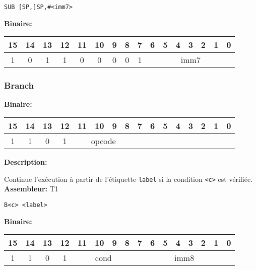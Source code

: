 \documentclass{article}
\begin{document}
    \begin{lstlisting}
SUB [SP,]SP,#<imm7>
    \end{lstlisting}



    \textbf{Binaire:}

    \begin{tabular}{| c c c c c c c c c c c c c c c c |}
        \hline
        15 & 14 & 13 & 12 & \multicolumn{1}{|c}{11} & 10 & 9 & 8 & \multicolumn{1}{|c}{7} & \multicolumn{1}{|c}{6} & 5 & 4 & 3 & 2 & 1 & 0 \\
        \hline
        1 & 0 & 1 & 1 & \multicolumn{1}{|c}{0} & 0 & 0 & 0 & \multicolumn{1}{|c}{1} & \multicolumn{7}{|c|}{imm7} \\
        \hline
    \end{tabular}

    \subsubsection{Branch}
    \label{subsubsec:Branching}

    \textbf{Binaire:}

    \begin{tabular}{| c c c c c c c c c c c c c c c c |}
        \hline
        15 & 14 & 13 & 12 & \multicolumn{1}{|c}{11} & 10 & 9 & 8 & \multicolumn{1}{|c}{7} & 6 & 5 & 4 & 3 & 2 & 1 & 0 \\
        \hline
        1 & 1 & 0 & 1 & \multicolumn{4}{|c}{opcode} & \multicolumn{8}{|c|}{} \\
        \hline
    \end{tabular}

    \label{subsubsubsec:CondBranch}

    \textbf{Description: }

    Continue l'exécution à partir de l'étiquette \texttt{label} si la condition \texttt{<c>} est vérifiée.\\

    \textbf{Assembleur:} T1

    \begin{lstlisting}
B<c> <label>
    \end{lstlisting}

    \textbf{Binaire:}

    \begin{tabular}{| c c c c c c c c c c c c c c c c |}
        \hline
        15 & 14 & 13 & 12 & \multicolumn{1}{|c}{11} & 10 & 9 & 8 & \multicolumn{1}{|c}{7} & 6 & 5 & 4 & 3 & 2 & 1 & 0 \\
        \hline
        1 & 1 & 0 & 1 & \multicolumn{4}{|c}{cond} & \multicolumn{8}{|c|}{imm8} \\
        \hline
    \end{tabular}
\end{document}
